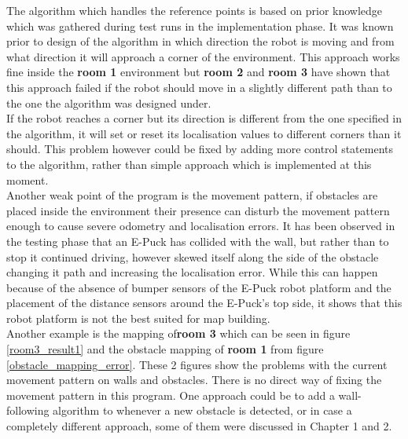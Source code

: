 The algorithm which handles the reference points is based on prior knowledge which was gathered during test runs in the implementation phase. It was known prior to design of the algorithm in which direction the robot is moving and from what direction it will approach a corner of the environment. This approach works fine inside the \textbf{room 1} environment but \textbf{room 2} and \textbf{room 3} have shown that this approach failed if the robot should move in a slightly different path than to the one the algorithm was designed under. \\
If the robot reaches a corner but its direction is different from the one specified in the algorithm, it will set or reset its localisation values to different corners than it should. This problem however could be fixed by adding more control statements to the algorithm, rather than simple approach which is implemented at this moment. \\[3ex]

Another weak point of the program is the movement pattern, if obstacles are placed inside the environment their presence can disturb the movement pattern enough to cause severe odometry and localisation errors. It has been observed in the testing phase that an E-Puck has collided with the wall, but rather than to stop it continued driving, however skewed itself along the side of the obstacle changing it path and increasing the localisation error. While this can happen because of the absence of bumper sensors of the E-Puck robot platform and the placement of the distance sensors around the E-Puck's top side, it shows that this robot platform is not the best suited for map building.\\
Another example is the mapping of\textbf{room 3 }which can be seen in figure \ref{room3_result1} and the obstacle mapping of \textbf{room 1} from figure \ref{obstacle_mapping_error}. These 2 figures show the problems with the current movement pattern on walls and obstacles. There is no direct way of fixing the movement pattern in this program. One approach could be to add a wall-following algorithm to whenever a new obstacle is detected, or in case a completely different approach, some of them were discussed in Chapter 1 and 2. \\[3ex]

